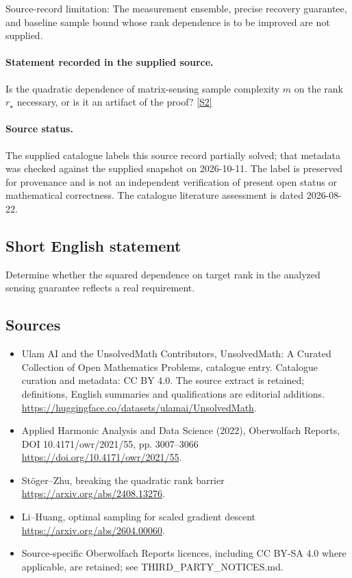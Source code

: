 \documentclass[11pt]{article}
\begin{document}
Source-record limitation: The measurement ensemble, precise recovery guarantee, and baseline sample bound whose rank dependence is to be improved are not supplied.
\paragraph{Statement recorded in the supplied source.}
Is the quadratic dependence of matrix-sensing sample complexity $m$ on the rank $r_\star$ necessary, or is it an artifact of the proof? \href{https://doi.org/10.4171/owr/2021/55}{[S2]}
\paragraph{Source status.}
The supplied catalogue labels this source record partially solved; that metadata was checked against the supplied snapshot on 2026-10-11. The label is preserved for provenance and is not an independent verification of present open status or mathematical correctness. The catalogue literature assessment is dated 2026-08-22.
\subsection{Short English statement}
Determine whether the squared dependence on target rank in the analyzed sensing guarantee reflects a real requirement.
\subsection{Sources}
\begin{itemize}
\item[S1] Ulam AI and the UnsolvedMath Contributors, UnsolvedMath: A Curated Collection of Open Mathematics Problems, catalogue entry. Catalogue curation and metadata: CC BY 4.0. The source extract is retained; definitions, English summaries and qualifications are editorial additions.
\url{https://huggingface.co/datasets/ulamai/UnsolvedMath}.
\item[S2] Applied Harmonic Analysis and Data Science (2022), Oberwolfach Reports, DOI 10.4171/owr/2021/55, pp. 3007--3066
\url{https://doi.org/10.4171/owr/2021/55}.
\item[S3] Stöger--Zhu, breaking the quadratic rank barrier
\url{https://arxiv.org/abs/2408.13276}.
\item[S4] Li--Huang, optimal sampling for scaled gradient descent
\url{https://arxiv.org/abs/2604.00060}.
\item Source-specific Oberwolfach Reports licences, including CC BY-SA 4.0 where applicable, are retained; see THIRD\_PARTY\_NOTICES.md.
\end{itemize}
\end{document}
